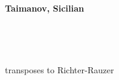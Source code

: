 \begin{center}\textbf{Taimanov, Sicilian}\\\end{center}
\newgame
{}\\
\notationoff
\begin{center}\showboard\\\end{center}
 transposes to Richter-Rauzer 
